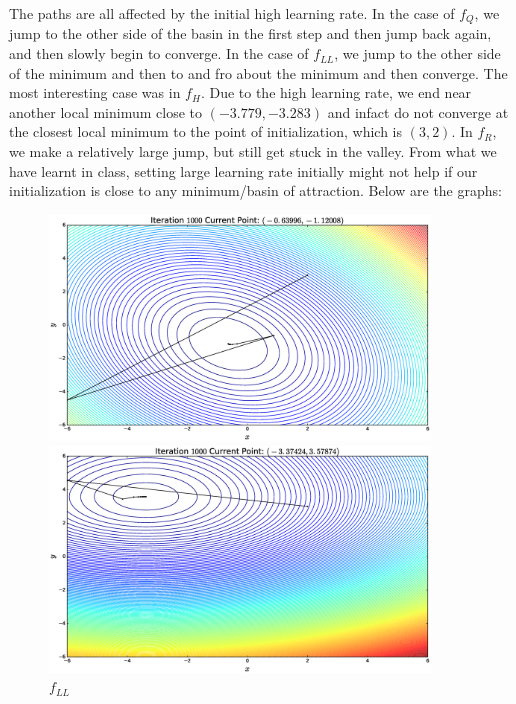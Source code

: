\documentclass{article}
\begin{document}
\begin{flushleft}
The paths are all affected by the initial high learning rate. In the case of \(f_{Q}\), we jump to the other side of the basin in the first step and then jump back again, and then slowly begin to converge. In the case of \(f_{LL}\), we jump to the other side of the minimum and then to and fro about the minimum and then converge. The most interesting case was in \(f_{H}\). Due to the high learning rate, we end near another local minimum close to \((-3.779, -3.283)\) and infact do not converge at the closest local minimum to the point of initialization, which is \((3, 2)\). In \(f_{R}\), we make a relatively large jump, but still get stuck in the valley. From what we have learnt in class, setting large learning rate initially might not help if our initialization is close to any minimum/basin of attraction. Below are the graphs:

\begin{figure}[H]
\begin{minipage}{0.45\linewidth}
\includegraphics[width=0.9\textwidth]{./images/quad_inv}
\caption{\(f_{Q}\)}
\end{minipage}
\hfill
\begin{minipage}{0.45\linewidth}
\includegraphics[width=0.9\textwidth]{./images/log_reg_inv}
\caption{\(f_{LL}\)}
\end{minipage}
\end{figure}


\end{flushleft}
\end{document}
